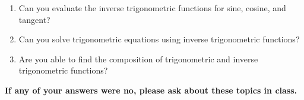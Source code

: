 \begin{enumerate}
\item Can you evaluate the inverse trigonometric functions for sine, cosine, and tangent?
\item Can you solve trigonometric equations using inverse trigonometric functions?
\item Are you able to find the composition of trigonometric and inverse trigonometric functions?

\end{enumerate}

\noindent \textbf{If any of your answers were no, please ask about these topics in class.}

